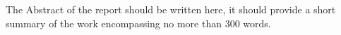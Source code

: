 \beforeabstract
{}
The Abstract of the report should be written here, it should provide a short summary of the work encompassing no more than 300 words.

\afterpreface \afterabstract
